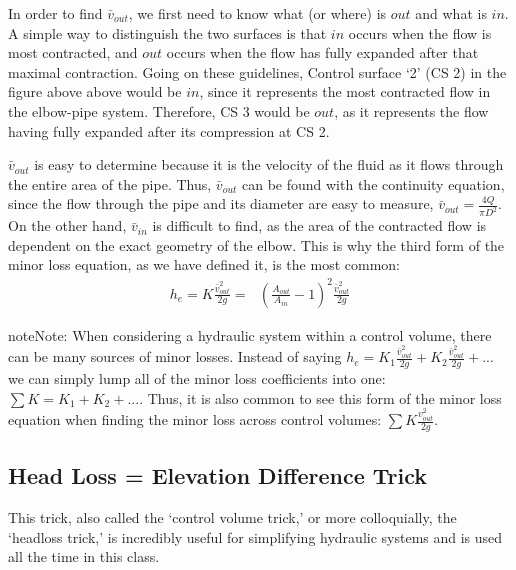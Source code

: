 \documentclass[letterpaper,10pt,english]{sphinxmanual}
\begin{document}
In order to find \(\bar v_{out}\), we first need to know what (or where) is \(out\) and what is \(in\). A simple way to distinguish the two surfaces is that \(in\) occurs when the flow is most contracted, and \(out\) occurs when the flow has fully expanded after that maximal contraction. Going on these guidelines, Control surface ‘2’ (CS 2) in the figure above above would be \(in\), since it represents the most contracted flow in the elbow-pipe system. Therefore, CS 3 would be \(out\), as it represents the flow having fully expanded after its compression at CS 2.

\(\bar v_{out}\) is easy to determine because it is the velocity of the fluid as it flows through the entire area of the pipe. Thus, \(\bar v_{out}\) can be found with the continuity equation, since the flow through the pipe and its diameter are easy to measure, \(\bar v_{out} = \frac{4 Q}{\pi D^2}\). On the other hand, \(\bar v_{in}\) is difficult to find, as the area of the contracted flow is dependent on the exact geometry of the elbow. This is why the third form of the minor loss equation, as we have defined it, is the most common:
\begin{equation}\label{equation:Fluids_Review/Fluids_Review_Design:Fluids_Review/Fluids_Review_Design:21}
\begin{split}h_e = K \frac{\bar v_{out}^2}{2g} = \,\,\,\, \left( \frac{A_{out}}{A_{in}} -1 \right)^2 \frac{\bar v_{out}^2}{2g}\end{split}
\end{equation}
\begin{sphinxadmonition}{note}{Note:}
When considering a hydraulic system within a control volume, there can be many sources of minor losses. Instead of saying \(h_e = K_1 \frac{\bar v_{out}^2}{2g} + K_2 \frac{\bar v_{out}^2}{2g} + ...\) we can simply lump all of the minor loss coefficients into one: \(\sum K = K_1 + K_2 + ...\). Thus, it is also common to see this form of the minor loss equation when finding the minor loss across control volumes: \(\sum K \frac{v_{out}^2}{2g}\).
\end{sphinxadmonition}


\subsection{Head Loss = Elevation Difference Trick}
\label{\detokenize{Fluids_Review/Fluids_Review_Design:head-loss-elevation-difference-trick}}\label{\detokenize{Fluids_Review/Fluids_Review_Design:id9}}
This trick, also called the ‘control volume trick,’ or more colloquially, the ‘headloss trick,’ is incredibly useful for simplifying hydraulic systems and is used all the time in this class.
\end{document}
